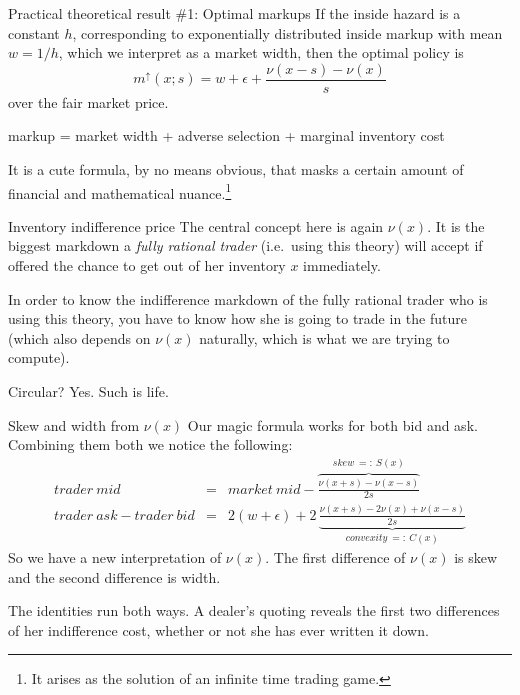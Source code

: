 \documentclass[10pt]{beamer}
\newcommand{\blue}[1]{\textcolor{pcblue}{#1}}
\begin{document}
\begin{frame}{Practical theoretical result \#1: Optimal markups}
If the inside hazard is a constant $h$, corresponding to exponentially distributed inside markup with mean $w = 1/h$, which we interpret as a \blue{market width}, then the optimal policy is
\begin{equation}
m^{\uparrow}(x;s) = w + \epsilon + \frac{\nu(x-s)-\nu(x)}{s}
\end{equation}
over the fair market price.
\begin{center}
\blue{markup = market width + adverse selection + marginal inventory cost}
\end{center}
It is a cute formula, by no means obvious, that masks a certain amount of financial and mathematical nuance.\footnote{It arises as the solution of an infinite time trading game.}
\end{frame}

\begin{frame}{Inventory indifference price}
The central concept here is again $\nu(x)$. It is the biggest markdown a \emph{fully rational trader} (i.e.\ using this theory) will accept if offered the chance to get out of her inventory $x$ immediately.
\vspace{1em}

In order to know the indifference markdown of the fully rational trader who is using this theory, you have to know how she is going to trade in the future (which also depends on $\nu(x)$ naturally, which is what we are trying to compute).
\vspace{1em}

Circular? Yes. Such is life.
\end{frame}

\begin{frame}{Skew and width from $\nu(x)$}
Our magic formula works for both bid and ask. Combining them both we notice the following:
\begin{eqnarray*}
trader\ mid & = & market\ mid - \overbrace{\frac{\nu(x+s) - \nu(x-s)}{2s}}^{skew\ =:\ S(x)} \\
trader\ ask - trader\ bid & = & 2(w+\epsilon) + 2\,\underbrace{\frac{\nu(x+s) - 2\nu(x) + \nu(x-s)}{2s}}_{convexity\ =:\ C(x)}
\end{eqnarray*}
So we have a new interpretation of $\nu(x)$. The first difference of $\nu(x)$ is skew and the second difference is width.
\vspace{1em}

The identities run both ways. A dealer's quoting reveals the first two differences of her indifference cost, whether or not she has ever written it down.
\end{frame}
\end{document}
